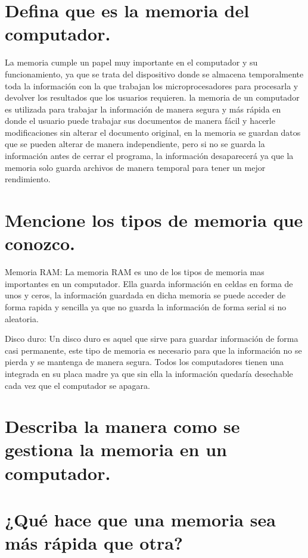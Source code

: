 \documentclass{article}
\begin{document}
\section{Defina que es la memoria del computador.}

La memoria cumple un papel muy importante en el computador y su funcionamiento, ya que se trata del dispositivo donde se almacena temporalmente toda la información con la que trabajan
los microprocesadores para procesarla y devolver los resultados que los usuarios requieren.
la memoria de un computador es utilizada para trabajar la información de manera segura y más rápida en donde el usuario puede trabajar sus documentos de manera fácil y hacerle modificaciones sin alterar el documento original, en la memoria se guardan datos que se pueden alterar de manera independiente, pero si no se guarda la información antes de cerrar el programa, la información desaparecerá ya que la memoria solo guarda archivos de manera temporal para tener un mejor rendimiento.


\section{Mencione los tipos de memoria que conozco.} \label{contenido}

Memoria RAM: La memoria RAM es uno de los tipos de memoria mas
importantes en un computador. Ella guarda información en celdas en forma de unos y ceros, la información guardada en dicha memoria se puede acceder de forma rapida y sencilla ya que no guarda la información de forma serial si no
aleatoria.

Disco duro: Un disco duro es aquel que sirve para guardar información de forma casi permanente, este tipo de memoria es necesario para que la información no se pierda y se mantenga de manera segura. Todos los computadores
tienen una integrada en su placa madre ya que sin ella la información quedaría desechable cada vez que el computador se apagara.


\section{Describa la manera como se gestiona la memoria en un computador.}



\section{¿Qué hace que una memoria sea más rápida que otra?}
\end{document}
